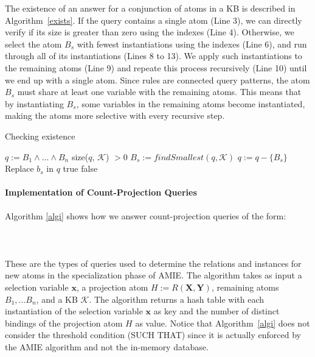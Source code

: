 The existence of an answer for a conjunction of atoms in a KB is described in Algorithm~\ref{exists}. 
If the query contains a single atom (Line 3), we can directly verify if its size is greater than zero using
the indexes (Line 4). Otherwise, we select the atom $B_s$ with fewest instantiations using the indexes (Line 6), 
and run through all of its instantiations (Lines 8 to 13). We apply such instantiations to the remaining atoms (Line 9)
and repeate this process recursively (Line 10) until we end up with a single atom. Since rules are connected query patterns, the atom $B_s$ must share at least
one variable with the remaining atoms. This means that by instantiating $B_s$, some variables in the remaining atoms 
become instantiated, making the atoms more selective with every recursive step.

\begin{algorithm}
\caption{Checking existence}
\label{exists}
\begin{algorithmic}[1]
    \State $q := B_1 \wedge ... \wedge B_n$
      \State \Return size($q$, $\mathcal{K}$) $> 0$
    \Else
      \State $B_s := findSmallest(q, \mathcal{K})$
      \State $q := q - \{ B_s \} $
	\State Replace $b_s$ in $q$
	    \State \Return true
	  \EndIf
      \EndFor
    \EndIf
    \State \Return false
\EndFunction
\end{algorithmic}
\end{algorithm}

\paragraph{Implementation of Count-Projection Queries} Algorithm \ref{algi} shows how we answer count-projection queries
of the form: \\ \\
 \\ \\
These are the types of queries used to determine the relations and instances for new atoms in the specialization
phase of AMIE. The algorithm takes as input a selection variable $\bm{x}$, a projection atom $H:=R(\bm{X},\bm{Y})$, remaining atoms $B_1, ... B_n$, 
and a KB $\mathcal{K}$. 
The algorithm returns a hash table with each instantiation of the selection variable 
$\bm{x}$ as key and the number of distinct bindings of the projection atom $H$ as value. Notice that Algorithm~\ref{algi}
does not consider the threshold condition (SUCH THAT) since it is actually enforced by the AMIE algorithm and not 
the in-memory database. 

